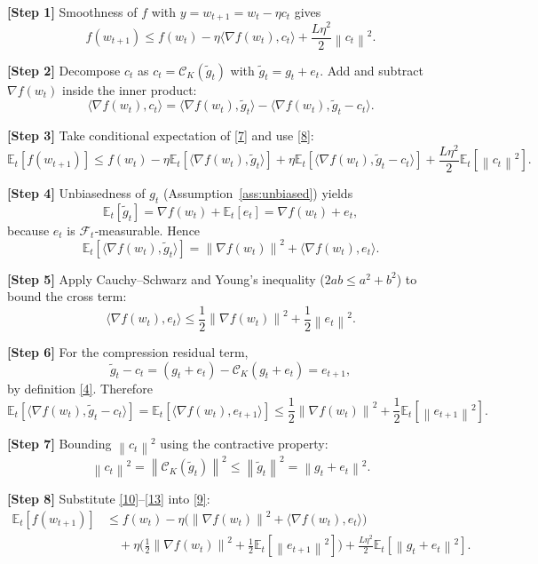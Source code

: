 \documentclass{article}
\newcommand{\E}{\mathbb{E}}
\newcommand{\norm}[1]{\left\lVert#1\right\rVert}
\newcommand{\topK}[1]{\mathcal{C}_K\!\left(#1\right)}
\begin{document}
\noindent\textbf{[Step 1]}  Smoothness of $f$ with $y=w_{t+1}=w_t-\eta c_t$ gives
\[
f(w_{t+1})\le f(w_t)-\eta\langle\nabla f(w_t),c_t\rangle
+\frac{L\eta^2}{2}\norm{c_t}^2 .
\tag{7}
\]

\noindent\textbf{[Step 2]}  Decompose $c_t$ as $c_t=\topK{\tilde g_t}$ with $\tilde g_t=g_t+e_t$.
Add and subtract $\nabla f(w_t)$ inside the inner product:
\[
\langle\nabla f(w_t),c_t\rangle
=
\langle\nabla f(w_t),\tilde g_t\rangle
-\langle\nabla f(w_t),\tilde g_t-c_t\rangle .
\tag{8}
\]

\noindent\textbf{[Step 3]}  Take conditional expectation of \eqref{7} and use \eqref{8}:
\[
\E_t[f(w_{t+1})]\le
f(w_t)-\eta\E_t[\langle\nabla f(w_t),\tilde g_t\rangle]
+\eta\E_t[\langle\nabla f(w_t),\tilde g_t-c_t\rangle]
+\frac{L\eta^2}{2}\E_t[\norm{c_t}^2].
\tag{9}
\]

\noindent\textbf{[Step 4]}  Unbiasedness of $g_t$ (Assumption~\ref{ass:unbiased}) yields
\[
\E_t[\tilde g_t]=\nabla f(w_t)+\E_t[e_t]=\nabla f(w_t)+e_t,
\]
because $e_t$ is $\mathcal{F}_t$‑measurable. Hence
\[
\E_t[\langle\nabla f(w_t),\tilde g_t\rangle]
= \norm{\nabla f(w_t)}^2+\langle\nabla f(w_t),e_t\rangle .
\tag{10}
\]

\noindent\textbf{[Step 5]}  Apply Cauchy–Schwarz and Young’s inequality ($2ab\le a^2+b^2$) to bound the cross term:
\[
\langle\nabla f(w_t),e_t\rangle
\le \frac{1}{2}\norm{\nabla f(w_t)}^2+\frac{1}{2}\norm{e_t}^2 .
\tag{11}
\]

\noindent\textbf{[Step 6]}  For the compression residual term,
\[
\tilde g_t-c_t = (g_t+e_t)-\topK{g_t+e_t}=e_{t+1},
\]
by definition \eqref{4}. Therefore
\[
\E_t[\langle\nabla f(w_t),\tilde g_t-c_t\rangle]
= \E_t[\langle\nabla f(w_t),e_{t+1}\rangle]
\le \frac{1}{2}\norm{\nabla f(w_t)}^2+\frac{1}{2}\E_t[\norm{e_{t+1}}^2].
\tag{12}
\]

\noindent\textbf{[Step 7]}  Bounding $\norm{c_t}^2$ using the contractive property:
\[
\norm{c_t}^2 = \norm{\topK{\tilde g_t}}^2
\le \norm{\tilde g_t}^2
= \norm{g_t+e_t}^2 .
\tag{13}
\]

\noindent\textbf{[Step 8]}  Substitute \eqref{10}–\eqref{13} into \eqref{9}:
\[
\begin{aligned}
\E_t[f(w_{t+1})]
&\le f(w_t)-\eta\Big(\norm{\nabla f(w_t)}^2+\langle\nabla f(w_t),e_t\rangle\Big) \\
&\quad +\eta\Big(\frac12\norm{\nabla f(w_t)}^2+\frac12\E_t[\norm{e_{t+1}}^2]\Big)
+\frac{L\eta^2}{2}\E_t[\norm{g_t+e_t}^2].
\end{aligned}
\tag{14}
\]
\end{document}
